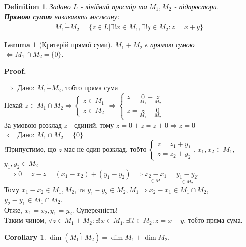 \documentclass[a4paper, 10pt]{article}
\makeatletter
\def\rightproof{$\boxed{\Rightarrow}$ }
\def\leftproof{$\boxed{\Leftarrow}$ }
\theoremstyle{theoremdd}
\newtheorem{definition}[theorem]{Definition}
\newtheorem{lemma}[theorem]{Lemma}
\newtheorem{corollary}[theorem]{Corollary}
\renewenvironment{proof}[1][Proof.\\]{\par
\pushQED{\hfill \qed}%
\normalfont \topsep6\p@\@plus6\p@\relax
\trivlist
\item\relax
{\bfseries
#1\@addpunct{.}}\hspace\labelsep\ignorespaces
}{%
\popQED\endtrivlist\@endpefalse
}
\makeatother
\begin{document}
	\begin{definition}
	Задано $L$ - лінійний простір та $M_1, M_2$ - підпростори.\\
	\textbf{Прямою сумою} називають множину:
	\begin{align*}
	M_1 \dot{+} M_2 = \{z \in L | \exists! x \in M_1, \exists! y \in M_2: z = x+y\}
	\end{align*}
	\end{definition}
	
	\begin{lemma}[Критерій прямої суми]
	$M_1 + M_2$ є прямою сумою $\iff M_1 \cap M_2 = \{0\}$.
	\end{lemma}
	
	\begin{proof}
	\rightproof Дано: $M_1 \dot{+} M_2$, тобто пряма сума\\
	Нехай $z \in M_1 \cap M_2 \Rightarrow \begin{cases} z \in M_1 \\ z \in M_2 \end{cases} \Rightarrow \begin{cases} z = \underset{M_1}{0} + \underset{M_2}{z} \\ z = \underset{M_1}{z} + \underset{M_2}{0} \end{cases}$\\
	За умовою розклад $z$ - єдиний, тому $z=0+z=z+0 \Rightarrow z = 0$
	\bigskip \\
	\leftproof Дано: $M_1 \cap M_2 = \{0\}$\\
	!Припустимо, що $z$ має не один розклад, тобто $\begin{cases} z = z_1 + y_1 \\ z = z_2 + y_2 \end{cases}$, $x_1,x_2 \in M_1$, $y_1,y_2 \in M_2$\\
	$\implies 0 = z-z=(x_1-x_2)+(y_1-y_2) \implies \underset{\in M_1}{x_2-x_1}=\underset{\in M_2}{y_1-y_2}$.\\
	Тому $x_1-x_2 \in M_1, M_2$, та $y_1-y_2 \in M_2, M_1 \Rightarrow x_2-x_1 \in M_1 \cap M_2$, $y_2 - y_1 \in M_1 \cap M_2$.\\
	Отже, $x_1 = x_2, y_1 = y_2$. Суперечність! \\
	Таким чином, $\forall z \in M_1 + M_2: \exists! x \in M_1, \exists! t \in M_2: z = x+y$, тобто пряма сума.
	\end{proof}
	
	\begin{corollary}
	$\dim{(M_1 \dot{+} M_2)} = \dim{M_1} + \dim{M_2}$.
	\end{corollary}
	
\end{document}
